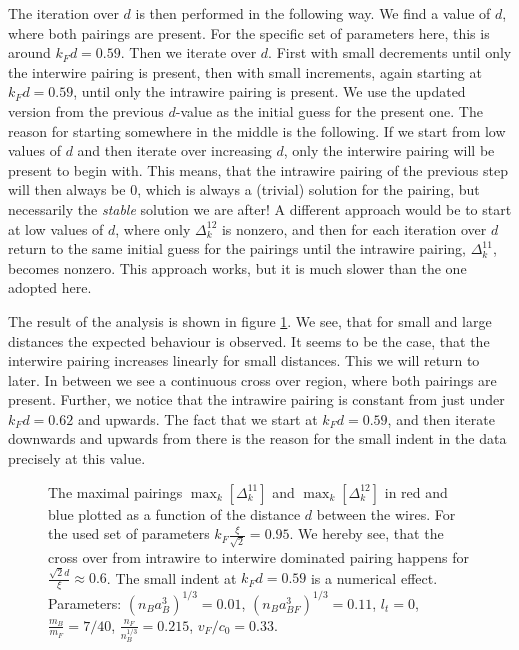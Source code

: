 The iteration over $d$ is then performed in the following way. We find a value of $d$, where both pairings are present. For the specific set of parameters here, this is around $k_Fd = 0.59$. Then we iterate over $d$. First with small decrements until only the interwire pairing is present, then with small increments, again starting at $k_Fd = 0.59$, until only the intrawire pairing is present. We use the updated version from the previous $d$-value as the initial guess for the present one. The reason for starting somewhere in the middle is the following. If we start from low values of $d$ and then iterate over increasing $d$, only the interwire pairing will be present to begin with. This means, that the intrawire pairing of the previous step will then always be $0$, which is always a (trivial) solution for the pairing, but necessarily the \textit{stable} solution we are after! A different approach would be to start at low values of $d$, where only $\Delta^{12}_k$ is nonzero, and then for each iteration over $d$ return to the same initial guess for the pairings until the intrawire pairing, $\Delta^{11}_k$, becomes nonzero. This approach works, but it is much slower than the one adopted here.  

The result of the analysis is shown in figure \ref{fig.maximalpairingddepend}. We see, that for small and large distances the expected behaviour is observed. It seems to be the case, that the interwire pairing increases linearly for small distances. This we will return to later. In between we see a continuous cross over region, where both pairings are present. Further, we notice that the intrawire pairing is constant from just under $k_Fd = 0.62$ and upwards. The fact that we start at $k_Fd =0.59$, and then iterate downwards and upwards from there is the reason for the small indent in the data precisely at this value.

\begin{figure} 
\begin{center}  
  
\caption{The maximal pairings $\max_k\left[\Delta^{11}_k\right]$ and $\max_k\left[\Delta^{12}_k\right]$ in red and blue plotted as a function of the distance $d$ between the wires. For the used set of parameters $k_F\frac{\xi}{\sqrt{2}} = 0.95$. We hereby see, that the cross over from intrawire to interwire dominated pairing happens for $\frac{\sqrt{2}d}{\xi} \approx 0.6$. The small indent at $k_Fd = 0.59$ is a numerical effect. Parameters: $(n_Ba_B^3)^{1/3} = 0.01$, $(n_Ba_{BF}^3)^{1/3} = 0.11$, $l_t = 0$, $\frac{m_B}{m_F} = 7/40$, $\frac{n_F}{n_B^{1/3}} = 0.215$, $v_F/c_0 = 0.33$. }  
\label{fig.maximalpairingddepend}  
\end{center}    
\end{figure}

